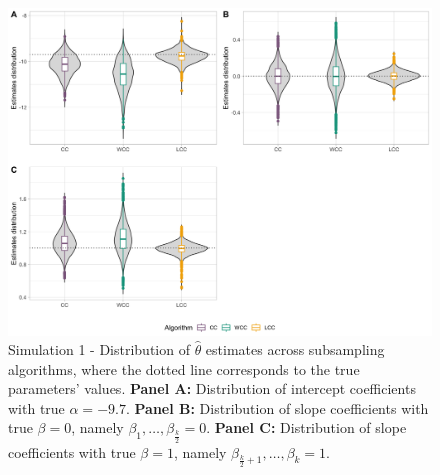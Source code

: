\begin{figure}[ht]
    \centering
    \includegraphics[width=\textwidth]{2_Figures/all_violins2.png}
    \caption[Simulation 1 - Distribution of Monte Carlo realizations $\hat{\theta}_{CC}$, $\hat{\theta}_{WCC}$ and $\hat{\theta}_{LCC}$]{Simulation 1 - Distribution of $\hat{\theta}$ estimates across subsampling algorithms, where the dotted line corresponds to the true parameters' values.
    \textbf{Panel A:} Distribution of intercept coefficients with true $\alpha= - 9.7$.
    \textbf{Panel B:} Distribution of slope coefficients with true $\beta=0$, namely $\beta_1, \dots, \beta_{\frac{k}{2}}=0$.
    \textbf{Panel C:} Distribution of slope coefficients with true $\beta=1$, namely $\beta_{\frac{k}{2}+1}, \dots, \beta_k=1$.}
    \label{fig:violin_int_e}
\end{figure}


 